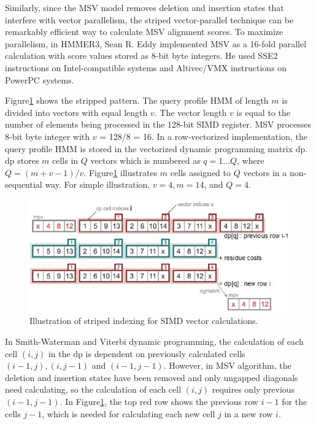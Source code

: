 Similarly, since the MSV model removes deletion and insertion states that interfere with vector parallelism, the striped vector-parallel technique can be remarkably efficient way to calculate MSV alignment scores. To maximize parallelism, in HMMER3\citep{HMMER3}, Sean R. Eddy implemented MSV as a 16-fold parallel calculation with score values stored as 8-bit byte integers. He used SSE2 instructions on Intel-compatible systems and Altivec/VMX instructions on PowerPC systems.

Figure\ref{fig:strip} shows the stripped pattern. The query profile HMM of length $m$ is divided into vectors with equal length $v$. The vector length $v$ is equal to the number of elements being processed in the 128-bit SIMD register. MSV processes 8-bit byte integer with $v$ = 128/8 = 16. In a row-vectorized implementation, the query profile HMM is stored in the vectorized dynamic programming matrix dp. dp stores $m$ cells in $Q$ vectors which is numbered as $q = 1...Q$, where $Q = (m+v-1)/v$. Figure\ref{fig:strip} illustrates $m$ cells assigned to $Q$ vectors in a non-sequential way. For simple illustration, $v = 4, m = 14$, and $Q = 4$.

\begin{figure}[!htb]
	\includegraphics{Figures/msv_vector.jpg}
	\caption{Illustration of striped indexing for SIMD vector calculations\citep{HMMER3}.}
	\label{fig:strip}
\end{figure}

In Smith-Waterman and Viterbi dynamic programming, the calculation of each cell $(i, j)$ in the dp is dependent on previously calculated cells $(i-1, j), (i, j-1)$ and $(i-1, j-1)$. However, in MSV algorithm, the deletion and insertion states have been removed and only ungapped diagonals need calculating, so the calculation of each cell $(i, j)$ requires only previous $(i-1, j-1)$. In Figure\ref{fig:strip}, the top red row shows the previous row $i-1$ for the cells $j-1$, which is needed for calculating each new cell $j$ in a new row $i$. 

